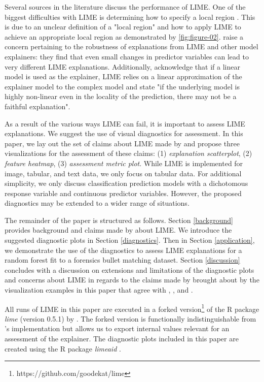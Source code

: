 \documentclass[AMS,STIX2COL]{WileyNJD-v2}\usepackage[]{graphicx}\usepackage[]{color}
\begin{document}
Several sources in the literature discuss the performance of LIME. One of the biggest difficulties with LIME is determining how to specify a local region \citep{laugel:2018} \citep{molnar:2019}. This is due to an unclear definition of a "local region" and how to apply LIME to achieve an appropriate local region as demonstrated by \autoref{fig:figure-02}. \citet{alvarezmelis:2018} raise a concern pertaining to the robustness of explanations from LIME and other model explainers: they find that even small changes in predictor variables can lead to very different LIME explanations. Additionally, \citet{ribeiro:2016} acknowledge that if a linear model is used as the explainer, LIME relies on a linear approximation of the explainer model to the complex model and state "if the underlying model is highly non-linear even in the locality of the prediction, there may not be a faithful explanation".

As a result of the various ways LIME can fail, it is important to assess LIME explanations. We suggest the use of visual diagnostics for assessment. In this paper, we lay out the set of claims about LIME made by \citet{ribeiro:2016} and propose three visualizations for the assessment of these claims: (1) \emph{explanation scatterplot}, (2) \emph{feature heatmap}, (3) \emph{assessment metric plot}. While LIME is implemented for image, tabular, and text data, we only focus on tabular data. For additional simplicity, we only discuss classification prediction models with a dichotomous response variable and continuous predictor variables. However, the proposed diagnostics may be extended to a wider range of situations.

The remainder of the paper is structured as follows. Section \ref{background} provides background and claims made by \citet{ribeiro:2016} about LIME. We introduce the suggested diagnostic plots in Section \ref{diagnostics}. Then in Section \ref{application}, we demonstrate the use of the diagnostics to assess LIME explanations for a random forest  fit to a forensics bullet matching dataset. Section \ref{discussion} concludes with a discussion on extensions and limitations of the diagnostic plots and concerns about LIME in regards to the claims made by \citet{ribeiro:2016} brought about by the visualization examples in this paper that agree with \citet{alvarezmelis:2018}, \citet{laugel:2018}, and \citet{molnar:2019}.

All runs of LIME in this paper are executed in a forked version\footnote{https://github.com/goodekat/lime} of the R package \emph{lime} (version 0.5.1) by \citet{pedersen:2020}. The forked version is functionally indistinguishable from \citeauthor{pedersen:2020}'s implementation but allows us to export internal values relevant for an assessment of the explainer. The diagnostic plots included in this paper are created using the R package \emph{limeaid} \citep{goode:2020}.
\end{document}

